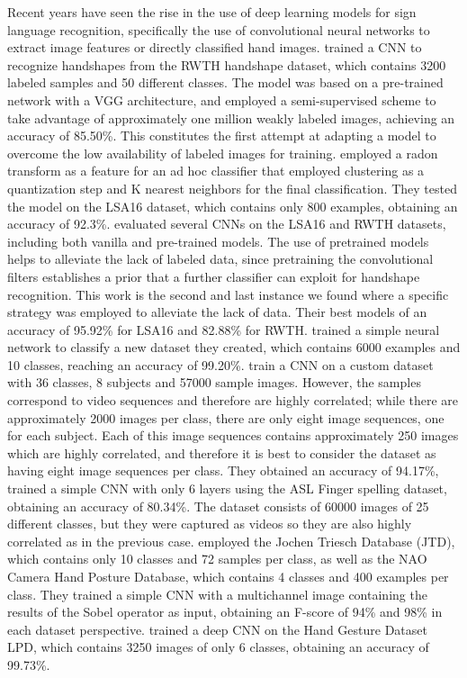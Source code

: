 Recent  years have seen the rise in the use of deep learning models for sign language recognition, specifically the use of convolutional neural networks to extract image features or directly classified hand images. \cite{koller16}  trained a  CNN to recognize handshapes  from the  RWTH handshape dataset,  which contains 3200 labeled samples and 50 different classes.  The model was based on a pre-trained network with a VGG architecture, and employed a semi-supervised scheme to take advantage of approximately  one million weakly labeled images, achieving an accuracy of 85.50\%. This constitutes the first attempt at adapting a model to overcome the low availability of labeled images for training. \cite{Ronchetti2016}  employed a radon transform as a feature for an ad hoc classifier that employed clustering as a quantization step and K nearest  neighbors  for the final classification. They tested the model on the LSA16 dataset,  which contains only 800 examples, obtaining an accuracy of 92.3\%. \cite{quiroga2017study}  evaluated several CNNs on the LSA16 and RWTH datasets, including both  vanilla and pre-trained models. The use of pretrained models helps to alleviate the lack of labeled data, since pretraining the convolutional filters establishes a prior that a further classifier can exploit for handshape recognition. This work is the second and last instance we found where a specific strategy was employed to alleviate the lack of data. Their best models of an accuracy of 95.92\% for LSA16 and 82.88\%  for RWTH. \cite{ciarp2018} trained a simple neural network to classify a new dataset they created, which contains 6000 examples and 10 classes, reaching an accuracy of 99.20\%. \cite{tang2015real} train a CNN on a custom dataset with 36 classes, 8 subjects and 57000 sample images. However, the samples correspond to video sequences and therefore are highly correlated;  while there are approximately 2000 images per class, there are only eight image sequences, one for each subject. Each of this image sequences  contains approximately 250 images  which are highly correlated,  and therefore it is best to consider the dataset as having eight image sequences per class. They obtained an accuracy of 94.17\%, \cite{ameen2017fingerspelling} trained a simple CNN with only 6 layers using the ASL Finger spelling dataset, obtaining an accuracy of 80.34\%. The dataset consists of 60000 images of 25 different classes, but they were captured as videos so they are also highly correlated as in the previous case. \cite{barros14multichannel} employed the Jochen Triesch Database (JTD), which contains only 10 classes and  72 samples per class, as well as the NAO Camera Hand Posture Database, which contains 4 classes and 400 examples per class. They trained a simple CNN with a multichannel image containing the results of the Sobel operator as input, obtaining an F-score of 94\%  and  98\% in  each dataset perspective. \cite{alani2018peru}  trained a deep CNN on the Hand Gesture Dataset LPD,  which contains 3250 images of only 6 classes, obtaining an accuracy of 99.73\%. 

